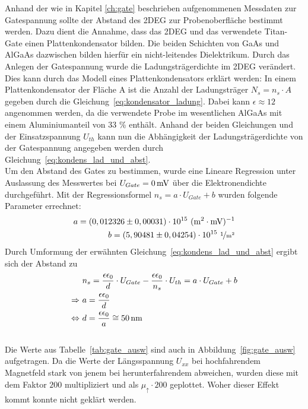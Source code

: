 Anhand der wie in Kapitel \ref{ch:gate} beschrieben aufgenommenen Messdaten zur Gatespannung sollte der Abstand des 2DEG zur Probenoberfläche bestimmt werden. Dazu dient die Annahme, dass das 2DEG und das verwendete Titan-Gate einen Plattenkondensator bilden. Die beiden Schichten von GaAs und AlGaAs dazwischen bilden hierfür ein nicht-leitendes Dielektrikum. 
Durch das Anlegen der Gatespannung wurde die Ladungsträgerdichte im 2DEG verändert.  Dies kann durch das Modell eines Plattenkondensators erklärt werden: In einem Plattenkondensator der Fläche A ist die Anzahl der Ladungsträger $N_s=n_s \cdot A$ gegeben durch die Gleichung~\eqref{eq:kondensator_ladung}. Dabei kann $\epsilon \approx 12$ angenommen werden, da die verwendete Probe im wesentlichen AlGaAs mit einem Aluminiumanteil von 33 \% enthält. Anhand der beiden Gleichungen und der Einsatzspannung $U_{th}$ kann nun die Abhängigkeit der Ladungsträgerdichte von der Gatespannung angegeben werden durch Gleichung~\eqref{eq:kondens_lad_und_abst}.\\

Um den Abstand des Gates zu bestimmen, wurde eine Lineare Regression unter Auslassung des Messwertes bei $U_{Gate}=\unit[0]{mV}$ über die Elektronendichte durchgeführt. Mit der Regressionsformel $n_s=a\cdot U_{Gate} + b$ wurden folgende Parameter errechnet:
\begin{align}
a = ( 0,012326 \pm 0,00031)\cdot 10^{15} ~ \unit{(m^2 \cdot mV)^{-1}}\\
b=( 5,90481 \pm 0,04254 )\cdot 10^{15} ~ \unitfrac{1}{m^2}
\end{align}
Durch Umformung der erwähnten Gleichung~\eqref{eq:kondens_lad_und_abst} ergibt sich der Abstand zu
\begin{align}
& n_s=\frac{\epsilon \epsilon_0}{d}\cdot U_{Gate} - \frac{\epsilon \epsilon_0}{n_s} \cdot U_{th}= a \cdot U_{Gate} + b \\
\Rightarrow~ & a=\frac{\epsilon \epsilon_0}{d}\\
\Leftrightarrow~ & d=\frac{\epsilon \epsilon_0}{a} \cong \unit[50]{nm}
\end{align}\\

Die Werte aus Tabelle~\ref{tab:gate_ausw} sind auch in Abbildung~\ref{fig:gate_ausw} aufgetragen. Da die Werte der Längsspannung $U_{xx}$ bei hochfahrendem Magnetfeld stark von jenem bei herunterfahrendem abweichen, wurden diese mit dem Faktor $200$ multipliziert und als $\mu_{\uparrow}\cdot 200$ geplottet. Woher dieser Effekt kommt konnte nicht geklärt werden.

